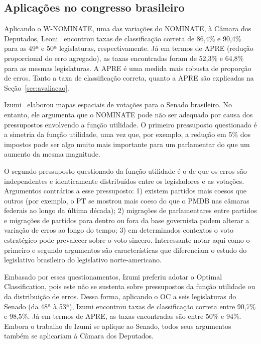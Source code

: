 \documentclass[
	article,			%
	12pt,				%
	oneside,			%
	a4paper,			%
	english,			%
	brazil,				%
	sumario=tradicional,
	oldfontcommands %
	]{abntex2}
\newcommand\nominate{NOMINATE\xspace}
\newcommand\wnominate{W-NOMINATE\xspace}
\begin{document}
\subsection{Aplicações no congresso brasileiro}

Aplicando o \wnominate, uma das variações do \nominate, à Câmara dos Deputados, Leoni~\cite{leoni02cdep} encontrou taxas de classificação correta de 86,4\% e 90,4\% para as 49ª e 50ª legislaturas, respectivamente. Já em termos de APRE (redução proporcional do erro agregado), as taxas encontradas foram de 52,3\% e 64,8\% para as mesmas legislaturas. A APRE é uma medida mais robusta de proporção de erros. Tanto a taxa de classificação correta, quanto a APRE são explicadas na Seção~\ref{sec:avaliacao}.

Izumi~\cite{izumi2016senado} elaborou mapas espaciais de votações para o Senado brasileiro. No entanto, ele argumenta que o \nominate pode não ser adequado por causa dos pressupostos envolvendo a função utilidade. O primeiro pressuposto questionado é a simetria da função utilidade, uma vez que, por exemplo, a redução em 5\% dos impostos pode ser algo muito mais importante para um parlamentar do que um aumento da mesma magnitude.

O segundo pressuposto questionado da função utilidade é o de que os erros são independentes e identicamente distribuídos entre os legisladores e as votações. Argumentos contrários a esse pressuposto: 1) existem partidos mais coesos que outros (por exemplo, o PT se mostrou mais coeso do que o PMDB nas câmaras federais ao longo da última década); 2) migrações de parlamentares entre partidos e migrações de partidos para dentro ou fora da base governista podem alterar a variação de erros ao longo do tempo;  3) em determinados contextos o voto estratégico pode prevalecer sobre o voto sincero. Interessante notar aqui como o primeiro e segundo argumentos são características que diferenciam o estudo do legislativo brasileiro do legislativo norte-americano.

Embasado por esses questionamentos, Izumi preferiu adotar o Optimal Classification, pois este não se sustenta sobre pressupostos da função utilidade ou da distribuição de erros. Dessa forma, aplicando o OC a seis legislaturas do Senado (da 48ª à 53ª), Izumi encontrou taxas de classificação correta entre 90,7\% e 98,5\%. Já em termos de APRE, as taxas encontradas são entre 50\% e 94\%. Embora o trabalho de Izumi se aplique ao Senado, todos seus argumentos também se aplicariam à Câmara dos Deputados.
\end{document}
